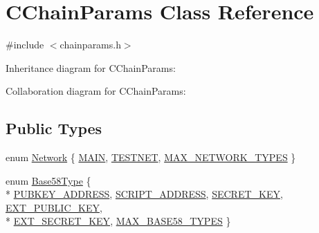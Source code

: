 \hypertarget{class_c_chain_params}{}\section{C\+Chain\+Params Class Reference}
\label{class_c_chain_params}


{\ttfamily \#include $<$chainparams.\+h$>$}



Inheritance diagram for C\+Chain\+Params\+:


Collaboration diagram for C\+Chain\+Params\+:
\subsection*{Public Types}
\begin{DoxyCompactItemize}
\item 
enum \hyperlink{class_c_chain_params_a5c4bb1d7c0205399ff06ee58fab7f176}{Network} \{ \hyperlink{class_c_chain_params_a5c4bb1d7c0205399ff06ee58fab7f176ab64dab5901e9dc8c7bf79daf9f7a2e1f}{M\+A\+I\+N}, 
\hyperlink{class_c_chain_params_a5c4bb1d7c0205399ff06ee58fab7f176a7bfe4c44c13adffa9807917840050c60}{T\+E\+S\+T\+N\+E\+T}, 
\hyperlink{class_c_chain_params_a5c4bb1d7c0205399ff06ee58fab7f176ac930c321a94adf771179465e98c13674}{M\+A\+X\+\_\+\+N\+E\+T\+W\+O\+R\+K\+\_\+\+T\+Y\+P\+E\+S}
 \}
\item 
enum \hyperlink{class_c_chain_params_aa294058ec2e3586bd8d03d6c39667058}{Base58\+Type} \{ \\*
\hyperlink{class_c_chain_params_aa294058ec2e3586bd8d03d6c39667058af088724f20c49c73e548f94d8f1808dd}{P\+U\+B\+K\+E\+Y\+\_\+\+A\+D\+D\+R\+E\+S\+S}, 
\hyperlink{class_c_chain_params_aa294058ec2e3586bd8d03d6c39667058adf0172df56140eb2f6fb7a59df0bb76a}{S\+C\+R\+I\+P\+T\+\_\+\+A\+D\+D\+R\+E\+S\+S}, 
\hyperlink{class_c_chain_params_aa294058ec2e3586bd8d03d6c39667058aacf95cbb9b5f51445295c704540adb18}{S\+E\+C\+R\+E\+T\+\_\+\+K\+E\+Y}, 
\hyperlink{class_c_chain_params_aa294058ec2e3586bd8d03d6c39667058a1259eb07831c689e393e5008d7bd0085}{E\+X\+T\+\_\+\+P\+U\+B\+L\+I\+C\+\_\+\+K\+E\+Y}, 
\\*
\hyperlink{class_c_chain_params_aa294058ec2e3586bd8d03d6c39667058ab5636e60152f35f6595fe413eae430b0}{E\+X\+T\+\_\+\+S\+E\+C\+R\+E\+T\+\_\+\+K\+E\+Y}, 
\hyperlink{class_c_chain_params_aa294058ec2e3586bd8d03d6c39667058a6b21a525c7fab64a5df656e708f71a98}{M\+A\+X\+\_\+\+B\+A\+S\+E58\+\_\+\+T\+Y\+P\+E\+S}
 \}
\end{DoxyCompactItemize}

